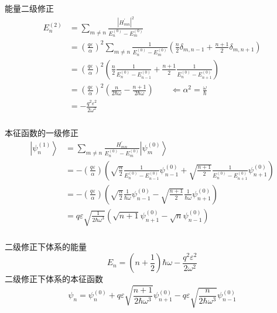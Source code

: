 \begin{frame}
  \frametitle{}
  能量二级修正
  $$
  \begin{aligned}
    E_n^{(2)} &= \sum_{m\ne n}  \frac{|H ^{\prime} _{mn}|^2}{E_n^{(0)}-E_m^{(0)}} \\ 
    &=\left(\frac{q\varepsilon}{\alpha}\right)^2 \sum_{m\ne n} \frac{1}{E_n^{(0)}-E_m^{(0)}} \left(\frac{n}{2}\delta _{m, n-1} +\frac{n+1}{2}\delta _{m, n+1}  \right) \\
    &=  \left(\frac{q\varepsilon}{\alpha}\right)^2 \left(\frac{n}{2}\frac{1}{E_n^{(0)}-E_{n-1}^{(0)}} +\frac{n+1}{2}\frac{1}{E_n^{(0)}-E_{n+1}^{(0)}}  \right)  \\
    &= \left(\frac{q\varepsilon}{\alpha}\right)^2 \left(\frac{n}{2\hbar \omega } -\frac{n+1}{2 \hbar \omega}  \right) \qquad \Leftarrow \alpha ^2 = \frac{ \omega }{\hbar} \\
    &= - \frac{q^2\varepsilon ^2}{2 \omega ^2}
  \end{aligned} $$
\end{frame} 

\begin{frame}
  \frametitle{}
本征函数的一级修正
$$
\begin{aligned}
  \left|\psi_n^{(1)}\right\rangle &= \sum_{m\ne n} \frac{H^{\prime}_{mn}}{E_n^{(0)}-E_m^{(0)}} \left|\psi_m^{(0)}\right\rangle \\
    &=  - \left(\frac{q\varepsilon}{\alpha}\right)\left(\sqrt{\frac{n}{2}} \frac{1}{E_n^{(0)}-E_{n-1}^{(0)}}\psi ^{(0)} _{n-1} +\sqrt{\frac{n+1}{2}} \frac{1}{E_n^{(0)}-E_{n+1}^{(0)}}\psi ^{(0)} _{n+1}  \right)  \\
    &=  - \left(\frac{q\varepsilon}{\alpha}\right)\left(\sqrt{\frac{n}{2}} \frac{1}{\hbar \omega}\psi ^{(0)} _{n-1} -\sqrt{\frac{n+1}{2}} \frac{1}{\hbar \omega}\psi ^{(0)} _{n+1}  \right)  \\ 
    &= q \varepsilon  \sqrt{\frac{1}{2\hbar \omega ^3 }}\left( \sqrt{n+1}\psi ^{(0)} _{n+1} -  \sqrt{n}\psi ^{(0)} _{n-1}  \right)
\end{aligned}  
$$  
\end{frame} 

\begin{frame}
  \frametitle{}
二级修正下体系的能量
\[ E_n = \left(n+\frac{1}{2}\right) \hbar \omega - \frac{q^2\varepsilon ^2}{2 \omega ^2}  \]
二级修正下体系的本征函数
\[ \psi _n =  \psi ^{(0)} _n + q \varepsilon  \sqrt{\frac{n+1}{2\hbar \omega ^3 }} \psi ^{(0)} _{n+1} - q \varepsilon  \sqrt{\frac{n}{2\hbar \omega ^3 }} \psi ^{(0)} _{n-1} \]
\end{frame} 

